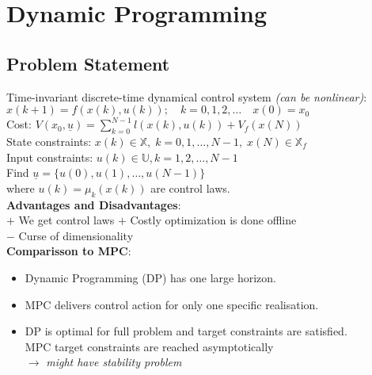 \documentclass[english]{latex4ei/latex4ei_sheet}
\begin{document}
\section{Dynamic Programming}
\begin{sectionbox}

\subsection{Problem Statement}
Time-invariant discrete-time dynamical control system \textit{(can be nonlinear)}:\\
$x(k+1)=f(x(k), u(k)) ; \quad k=0,1,2, \ldots \quad x(0)=x_{0}$ \\
Cost: $V\left(x_{0}, \underline{u}\right)=\sum\limits_{k=0}^{N-1} l(x(k), u(k))+V_{f}(x(N))$ \\
State constraints: $x(k) \in \mathbb{X},\; k=0,1, \ldots, N-1,\; x(N) \in \mathbb{X}_{f}$\\
Input constraints: $u(k) \in \mathbb{U}, k=1,2, \ldots, N-1$ \vspace{0.1cm}\\ 
Find $\underline{u}=\{u(0),u(1), \ldots, u(N-1)\}$ \\where $u(k)=\mu_{k}(x(k))$ are control laws.
\vspace{0.1cm}\\
\textbf{Advantages and Disadvantages}:\\
$+$ We get control laws \qquad $+$ Costly optimization is done offline\\
$-$ Curse of dimensionality
\vspace{0.1cm}\\
\textbf{Comparisson to MPC}:
\begin{itemize}
    \item Dynamic Programming (DP) has one large horizon.
    \item MPC delivers control action for only one specific realisation.
    \item DP is optimal for full problem and target constraints are satisfied.\\
    MPC target constraints are reached asymptotically\\ $\rightarrow$ \textit{might have stability problem}
\end{itemize}


\end{sectionbox}
\end{document}
